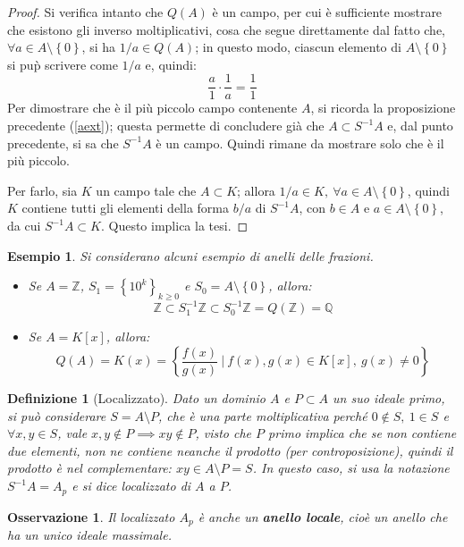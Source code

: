 \documentclass[11pt]{article}
\theoremstyle{style}
\newtheorem{esempio}{Esempio}[section]
\newtheorem{definizione}{Definizione}[section]
\newtheorem{osservazione}{Osservazione}[section]
\numberwithin{equation}{subsection}
\renewcommand{\textbf}[1]{\textsf{\bfseries #1}}
\begin{document}
	\begin{proof}
		Si verifica intanto che $Q(A)$ \`e un campo, per cui \`e sufficiente mostrare che esistono gli inverso moltiplicativi, cosa che segue direttamente dal fatto che, $\forall a \in A \setminus \left\{ 0 \right\} $, si ha $1 / a \in Q(A)$; in questo modo, ciascun elemento di $A\setminus\left\{ 0 \right\} $ si pu\`p scrivere come $1 / a$ e, quindi:
		\[
		\frac{a}{1}\cdot \frac{1}{a} = \frac{1}{1}
		\] 
		Per dimostrare che \`e il pi\`u piccolo campo contenente $A$, si ricorda la proposizione precedente (\ref{aext}); questa permette di concludere gi\`a che $A \subset S^{-1}A$ e, dal punto precedente, si sa che $S^{-1}A$ \`e un campo.
		Quindi rimane da mostrare solo che \`e il pi\`u piccolo.

		Per farlo, sia $K$ un campo tale che $A \subset K$; allora $1 / a \in K , \ \forall a \in A \setminus\left\{ 0 \right\} $, quindi $K$ contiene tutti gli elementi della forma $b / a$ di $S^{-1}A$, con $b \in A$ e $a \in A \setminus\left\{ 0 \right\} $, da cui $S^{-1}A \subset K$.
		Questo implica la tesi.
	\end{proof}
\begin{esempio}
	Si considerano alcuni esempio di anelli delle frazioni.
	\begin{itemize}
		\item Se $A = \mathbb{Z}$, $S_1 = \left\{ 10^k \right\} _{k\ge 0} $ e $S_0 = A \setminus\left\{ 0 \right\} $, allora:
			\[
			\mathbb{Z} \subset S_1^{-1}\mathbb{Z}\subset S_0^{-1}\mathbb{Z}= Q(\mathbb{Z}) =  \mathbb{Q}
			\] 
		\item Se $A = K[x]$, allora:
			\[
				Q(A)= K(x) = \left\{ \frac{f(x)}{g(x)}\ \bigg\lvert \ f(x) , g(x) \in K[x]  , \ g(x) \neq 0\right\}
			\] 
	\end{itemize}
\end{esempio}
\begin{definizione}
	[Localizzato]
		Dato un dominio $A$ e $P \subset A$ un suo ideale primo, si pu\`o considerare $S = A\setminus P$, che \`e una parte moltiplicativa perch\'e $0 \not \in S, \ 1 \in S$ e $\forall x,y \in S$, vale $x,y \not \in P \implies xy \not \in P$, visto che $P$ primo implica che se non contiene due elementi, non ne contiene neanche il prodotto (per controposizione), quindi il prodotto \`e nel complementare: $xy \in A \setminus P = S$.
			In questo caso, si usa la notazione $S^{-1}A = A_p$ e si dice \textit{localizzato} di $A$ a $P$.
\end{definizione}
\begin{osservazione}
Il localizzato $A_p$ \`e anche un \textbf{anello locale}, cio\`e un anello che ha un unico ideale massimale.
\end{osservazione}
\end{document}

